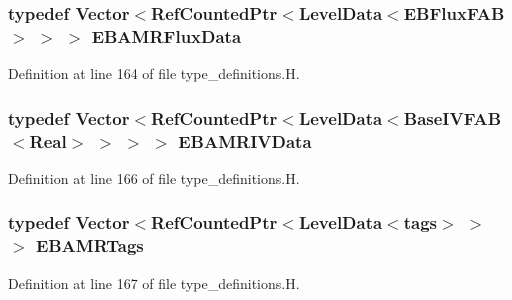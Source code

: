 \subsubsection[{\texorpdfstring{E\+B\+A\+M\+R\+Flux\+Data}{EBAMRFluxData}}]{\setlength{\rightskip}{0pt plus 5cm}typedef Vector$<$Ref\+Counted\+Ptr$<$Level\+Data$<$E\+B\+Flux\+F\+AB$>$ $>$ $>$ {\bf E\+B\+A\+M\+R\+Flux\+Data}}\hypertarget{type__definitions_8H_aadad278b2e5d3d4abcf9032f90ba78c3}{}\label{type__definitions_8H_aadad278b2e5d3d4abcf9032f90ba78c3}


Definition at line 164 of file type\+\_\+definitions.\+H.

\subsubsection[{\texorpdfstring{E\+B\+A\+M\+R\+I\+V\+Data}{EBAMRIVData}}]{\setlength{\rightskip}{0pt plus 5cm}typedef Vector$<$Ref\+Counted\+Ptr$<$Level\+Data$<$Base\+I\+V\+F\+AB$<$Real$>$ $>$ $>$ $>$ {\bf E\+B\+A\+M\+R\+I\+V\+Data}}\hypertarget{type__definitions_8H_a6b8fa905d55cbb491b52180386f0e0c1}{}\label{type__definitions_8H_a6b8fa905d55cbb491b52180386f0e0c1}


Definition at line 166 of file type\+\_\+definitions.\+H.

\subsubsection[{\texorpdfstring{E\+B\+A\+M\+R\+Tags}{EBAMRTags}}]{\setlength{\rightskip}{0pt plus 5cm}typedef Vector$<$Ref\+Counted\+Ptr$<$Level\+Data$<${\bf tags}$>$ $>$ $>$ {\bf E\+B\+A\+M\+R\+Tags}}\hypertarget{type__definitions_8H_a4eb540da9eb275c3e4225830ae526113}{}\label{type__definitions_8H_a4eb540da9eb275c3e4225830ae526113}


Definition at line 167 of file type\+\_\+definitions.\+H.

